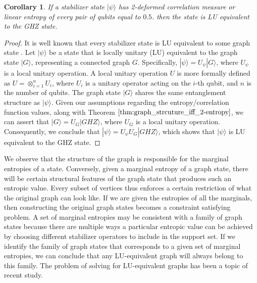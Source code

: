 \documentclass{article}
\newtheorem{corollary}[theorem]{Corollary}
\newcommand{\ket}[1]{|#1\rangle}
\begin{document}
\begin{corollary}
    If a stabilizer state $\ket{\psi}$ has 2-deformed correlation measure or linear entropy of every pair of qubits equal to $0.5$. then the state is LU equivalent to the GHZ state.
\end{corollary}
\begin{proof}
    It is well known that every stabilizer state is LU equivalent to some graph state \cite{Walter_multipartite_entanglement}. Let \(\ket{\psi}\) be a state that is locally unitary (LU) equivalent to the graph state \(\ket{G}\), representing a connected graph \(G\). Specifically, \(\ket{\psi} = U_{\psi} \ket{G}\), where \(U_{\psi}\) is a local unitary operation. A local unitary operation \(U\) is more formally defined as \(U = \otimes_{i=1}^{n} U_i\), where \(U_i\) is a unitary operator acting on the \(i\)-th qubit, and \(n\) is the number of qubits. The graph state \(\ket{G}\) shares the same entanglement structure as \(\ket{\psi}\). Given our assumptions regarding the entropy/correlation function values, along with Theorem \(\ref{thm:graph_strcuture_iff_2-entropy}\), we can assert that \(\ket{G} = U_G \ket{GHZ}\), where \(U_G\) is a local unitary operation. Consequently, we conclude that \(\ket{\psi} = U_{\psi} U_G \ket{GHZ}\), which shows that \(\ket{\psi}\) is LU equivalent to the GHZ state.
\end{proof}

 We observe that the structure of the graph is responsible for the marginal entropies of a state. Conversely, given a marginal entropy of a graph state, there will be certain structural features of the graph state that produces such an entropic value. Every subset of vertices thus enforces a certain restriction of what the original graph can look like. If we are given the entropies of all the marginals, then constructing the original graph states becomes a constraint satisfying problem. A set of marginal entropies may be consistent with a family of graph states because there are multiple ways a particular entropic value can be achieved by choosing different stabilizer operators to include in the support set. If we identify the family of graph states that corresponds to a given set of marginal entropies, we can conclude that any LU-equivalent graph will always belong to this family. The problem of solving for LU-equivalent graphs has been a topic of recent study.

\end{document}
